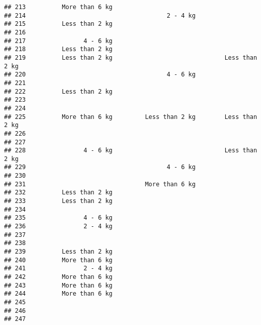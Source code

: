 \documentclass[
]{article}
\begin{document}
\begin{verbatim}
## 213          More than 6 kg                                             
## 214                                       2 - 4 kg                      
## 215          Less than 2 kg                                             
## 216                                                                     
## 217                4 - 6 kg                                             
## 218          Less than 2 kg                                             
## 219          Less than 2 kg                               Less than 2 kg
## 220                                       4 - 6 kg                      
## 221                                                                     
## 222          Less than 2 kg                                             
## 223                                                                     
## 224                                                                     
## 225          More than 6 kg         Less than 2 kg        Less than 2 kg
## 226                                                                     
## 227                                                                     
## 228                4 - 6 kg                               Less than 2 kg
## 229                                       4 - 6 kg                      
## 230                                                                     
## 231                                 More than 6 kg                      
## 232          Less than 2 kg                                             
## 233          Less than 2 kg                                             
## 234                                                                     
## 235                4 - 6 kg                                             
## 236                2 - 4 kg                                             
## 237                                                                     
## 238                                                                     
## 239          Less than 2 kg                                             
## 240          More than 6 kg                                             
## 241                2 - 4 kg                                             
## 242          More than 6 kg                                             
## 243          More than 6 kg                                             
## 244          More than 6 kg                                             
## 245                                                                     
## 246                                                                     
## 247                                                                     

\end{verbatim}
\end{document}
